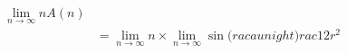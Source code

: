 \documentclass[preview]{standalone}
\begin{document}
\begin{align*}
\lim_{n \to \infty} n A (n) \\ &= \lim_{n \to \infty} n \times \lim_{n \to \infty} \sin \big( rac {	au} {n} 
ight) rac {1} {2} r^2
\end{align*}
\end{document}
